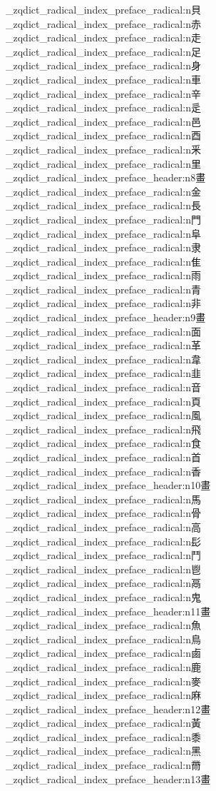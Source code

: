 {\begin{multicols}{5}
  \_zqdict_radical_index_preface_radical:n{貝}
  \_zqdict_radical_index_preface_radical:n{赤}
  \_zqdict_radical_index_preface_radical:n{走}
  \_zqdict_radical_index_preface_radical:n{足}
  \_zqdict_radical_index_preface_radical:n{身}
  \_zqdict_radical_index_preface_radical:n{車}
  \_zqdict_radical_index_preface_radical:n{辛}
  \_zqdict_radical_index_preface_radical:n{辵}
  \_zqdict_radical_index_preface_radical:n{邑}
  \_zqdict_radical_index_preface_radical:n{酉}
  \_zqdict_radical_index_preface_radical:n{釆}
  \_zqdict_radical_index_preface_radical:n{里}
  \_zqdict_radical_index_preface_header:n{8畫}
  \_zqdict_radical_index_preface_radical:n{金}
  \_zqdict_radical_index_preface_radical:n{長}
  \_zqdict_radical_index_preface_radical:n{門}
  \_zqdict_radical_index_preface_radical:n{阜}
  \_zqdict_radical_index_preface_radical:n{隶}
  \_zqdict_radical_index_preface_radical:n{隹}
  \_zqdict_radical_index_preface_radical:n{雨}
  \_zqdict_radical_index_preface_radical:n{青}
  \_zqdict_radical_index_preface_radical:n{非}
  \_zqdict_radical_index_preface_header:n{9畫}
  \_zqdict_radical_index_preface_radical:n{面}
  \_zqdict_radical_index_preface_radical:n{革}
  \_zqdict_radical_index_preface_radical:n{韋}
  \_zqdict_radical_index_preface_radical:n{韭}
  \_zqdict_radical_index_preface_radical:n{音}
  \_zqdict_radical_index_preface_radical:n{頁}
  \_zqdict_radical_index_preface_radical:n{風}
  \_zqdict_radical_index_preface_radical:n{飛}
  \_zqdict_radical_index_preface_radical:n{食}
  \_zqdict_radical_index_preface_radical:n{首}
  \_zqdict_radical_index_preface_radical:n{香}
  \_zqdict_radical_index_preface_header:n{10畫}
  \_zqdict_radical_index_preface_radical:n{馬}
  \_zqdict_radical_index_preface_radical:n{骨}
  \_zqdict_radical_index_preface_radical:n{高}
  \_zqdict_radical_index_preface_radical:n{髟}
  \_zqdict_radical_index_preface_radical:n{鬥}
  \_zqdict_radical_index_preface_radical:n{鬯}
  \_zqdict_radical_index_preface_radical:n{鬲}
  \_zqdict_radical_index_preface_radical:n{鬼}
  \_zqdict_radical_index_preface_header:n{11畫}
  \_zqdict_radical_index_preface_radical:n{魚}
  \_zqdict_radical_index_preface_radical:n{鳥}
  \_zqdict_radical_index_preface_radical:n{鹵}
  \_zqdict_radical_index_preface_radical:n{鹿}
  \_zqdict_radical_index_preface_radical:n{麥}
  \_zqdict_radical_index_preface_radical:n{麻}
  \_zqdict_radical_index_preface_header:n{12畫}
  \_zqdict_radical_index_preface_radical:n{黃}
  \_zqdict_radical_index_preface_radical:n{黍}
  \_zqdict_radical_index_preface_radical:n{黑}
  \_zqdict_radical_index_preface_radical:n{黹}
  \_zqdict_radical_index_preface_header:n{13畫}

\end{multicols}}
